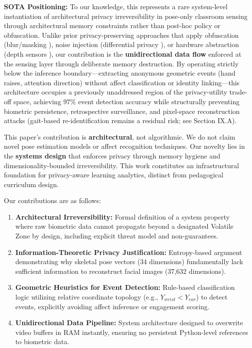 \documentclass[conference]{IEEEtran}
\begin{document}
\textbf{SOTA Positioning:} To our knowledge, this represents a rare system-level instantiation of architectural privacy irreversibility in pose-only classroom sensing through architectural memory constraints rather than post-hoc policy or obfuscation. Unlike prior privacy-preserving approaches that apply obfuscation (blur/masking \cite{b3}), noise injection (differential privacy \cite{b5}), or hardware abstraction (depth sensors \cite{b9}), our contribution is the \textbf{unidirectional data flow} enforced at the sensing layer through deliberate memory destruction. By operating strictly below the inference boundary—extracting anonymous geometric events (hand raises, attention direction) without affect classification or identity linking—this architecture occupies a previously unaddressed region of the privacy-utility trade-off space, achieving 97\% event detection accuracy while structurally preventing biometric persistence, retrospective surveillance, and pixel-space reconstruction attacks (gait-based re-identification remains a residual risk; see Section IX.A).

This paper's contribution is \textbf{architectural}, not algorithmic. We do not claim novel pose estimation models or affect recognition techniques. Our novelty lies in the \textbf{systems design} that enforces privacy through memory hygiene and dimensionality-bounded irreversibility. This work constitutes an infrastructural foundation for privacy-aware learning analytics, distinct from pedagogical curriculum design.

Our contributions are as follows:
\begin{enumerate}
    \item \textbf{Architectural Irreversibility:} Formal definition of a system property where raw biometric data cannot propagate beyond a designated Volatile Zone by design, including explicit threat model and non-guarantees.
    \item \textbf{Information-Theoretic Privacy Justification:} Entropy-based argument demonstrating why skeletal pose vectors (34 dimensions) fundamentally lack sufficient information to reconstruct facial images (37,632 dimensions).
    \item \textbf{Geometric Heuristics for Event Detection:} Rule-based classification logic utilizing relative coordinate topology (e.g., $Y_{wrist} < Y_{ear}$) to detect events, explicitly avoiding affect inference or engagement scoring.
    \item \textbf{Unidirectional Data Pipeline:} System architecture designed to overwrite video buffers in RAM instantly, ensuring no persistent Python-level references to biometric data.
\end{enumerate}
\end{document}
